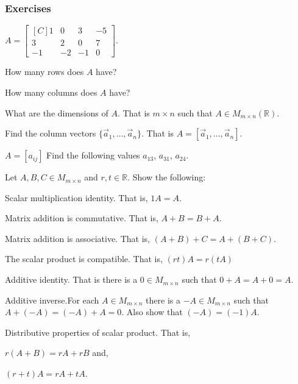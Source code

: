 \subsubsection{Exercises}
\begin{exercise}
$A=\begin{bmatrix*}[C]
1  & 0  & 3  & -5\\
3  & 2  & 0  & 7 \\
-1 & -2 & -1 & 0
\end{bmatrix*}$.\\
\begin{inparaenum}[a.)]
\item How many rows does $A$ have?\\
\item How many columns does $A$ have?\\
\item What are the dimensions of $A$. That is $m \times n$ such that 
$A \in M_{m\times n}(\mathbb{R})$.\\
\item Find the column vectors $\{\vec{a}_1,\ldots,\vec{a}_n\}$. That is
$A=[\vec{a}_1,\ldots,\vec{a}_n]$.\\
\item $A=[a_{ij}]$ Find the following values $a_{13}$, $a_{31}$, $a_{24}$. 
\end{inparaenum}
\end{exercise}
\begin{exercise}
Let $A,B,C \in M_{m\times n}$ and $r,t \in \mathbb{R}$. Show 
the following:\\
\begin{inparaenum}[a.)]
\item Scalar multiplication identity. That is, $1 A=A$.\\
\item Matrix addition is commutative. That is, 
$A+B=B+A$.\\
\item Matrix addition is associative. That is, 
$(A+B)+C=A+(B+C)$.\\
\item The scalar product is compatible. That is, $(rt)A=r(tA)$\.\\
\item Additive identity. That is there is a $0\in M_{m\times n}$ such that
 $0+A=A+0=A$.\\
\item Additive inverse.For each $A \in M_{m \times n}$ there is a $-A \in M_{m\times n}$ such 
that $A+(-A)=(-A)+A=0$.
Also show that $(-A)=(-1)A$. \\
\item Distributive properties of scalar product. That is, \\
\begin{inparaenum}[i.)]
\indent \item  $r(A+B)=rA+rB$ and,\\
\indent \item  $(r+t)A=rA+tA$.
\end{inparaenum}
\end{inparaenum} 
\end{exercise}
